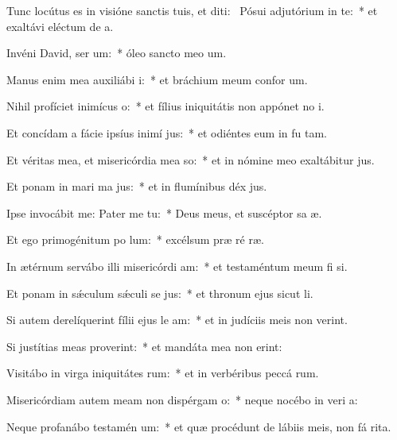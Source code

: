 \item Tunc locútus es in visióne sanctis tuis, et diti:~\pscross{} Pósui adjutórium in te:~* et exaltávi eléctum de  a.
\item Invéni David, ser um:~* óleo sancto meo  um.
\item Manus enim mea auxiliábi i:~* et bráchium meum confor um.
\item Nihil profíciet inimícus  o:~* et fílius iniquitátis non appónet no i.
\item Et concídam a fácie ipsíus inimí jus:~* et odiéntes eum in fu tam.
\item Et véritas mea, et misericórdia mea  so:~* et in nómine meo exaltábitur  jus.
\item Et ponam in mari ma jus:~* et in flumínibus déx jus.
\item Ipse invocábit me: Pater me  tu:~* Deus meus, et suscéptor sa æ.
\item Et ego primogénitum po lum:~* excélsum præ ré ræ.
\item In ætérnum servábo illi misericórdi am:~* et testaméntum meum fi si.
\item Et ponam in sǽculum sǽculi se jus:~* et thronum ejus sicut  li.
\item Si autem derelíquerint fílii ejus le am:~* et in judíciis meis non verint.
\item Si justítias meas proverint:~* et mandáta mea non erint:
\item Visitábo in virga iniquitátes rum:~* et in verbéribus peccá rum.
\item Misericórdiam autem meam non dispérgam  o:~* neque nocébo in veri a:
\item Neque profanábo testamén um:~* et quæ procédunt de lábiis meis, non fá rita.
